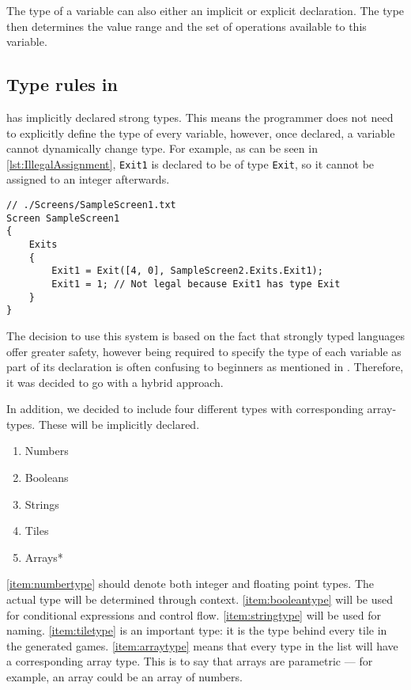 The type of a variable can also either an implicit or explicit declaration.
The type then determines the value range and the set of operations available to this variable.

\subsection*{Type rules in \dazel{}}
\dazel{} has implicitly declared strong types.
This means the programmer does not need to explicitly define the type of every variable, however, once declared, a variable
cannot dynamically change type.
For example, as can be seen in \ref{lst:IllegalAssignment}, \texttt{Exit1} is declared to be of type \texttt{Exit}, so it cannot be assigned to an integer afterwards.

\begin{lstlisting}[language=CSharp, caption={Example of an illegal assingment}, label={lst:IllegalAssignment},escapechar=|]
// ./Screens/SampleScreen1.txt
Screen SampleScreen1 
{
    Exits 
    {
        Exit1 = Exit([4, 0], SampleScreen2.Exits.Exit1);
        Exit1 = 1; // Not legal because Exit1 has type Exit
    }
}
\end{lstlisting}

The decision to use this system is based on the fact that strongly typed languages offer greater safety, however being required to
specify the type of each variable as part of its declaration is often confusing to beginners as mentioned in .
Therefore, it was decided to go with a hybrid approach.

In addition, we decided to include four different types with corresponding array-types. These will be implicitly declared.

\begin{multicols}{3}
    \begin{enumerate}
        \item Numbers\label{item:numbertype}
        \item Booleans\label{item:booleantype}
        \item Strings\label{item:stringtype}
        \item Tiles\label{item:tiletype}
        \item Arrays*\label{item:arraytype}
    \end{enumerate}
\end{multicols}

\ref{item:numbertype} should denote both integer and floating point types. The actual type will be determined through context. \ref{item:booleantype} will be used for conditional expressions and control flow.
\ref{item:stringtype} will be used for naming.
\ref{item:tiletype} is an important type: it is the type behind every tile in the generated games.
\ref{item:arraytype} means that every type in the list will have a corresponding array type. This is to say that arrays are parametric — for example, an array could be an array of numbers.

